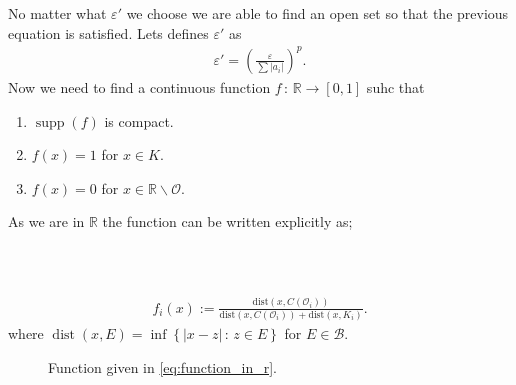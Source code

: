 \documentclass{beamer}
\numberwithin{equation}{section}
\DeclareMathOperator{\supp}{supp}
\DeclareMathOperator{\dist}{dist}
\begin{document}
\begin{frame}\frametitle{{\normalsize \secname} \\ {\large \subsecname}}
    No matter what $\varepsilon'$ we choose we are able to find an open set so that the previous equation is satisfied.
    Lets defines $\varepsilon'$ as
    \begin{align}
        \varepsilon' = \left( \frac{\varepsilon}{\sum |a_i|} \right)^p.
    \end{align}
    Now we need to find a continuous function $f \, : \, \mathbb{R} \to [0,1]$ suhc that
    \begin{enumerate}
        \item $\supp(f)$ is compact.
        \item $f(x) = 1$ for $x \in K$.
        \item $f(x) = 0$ for $x \in \mathbb{R}\backslash \mathcal{O}$.
    \end{enumerate}
    As we are in $\mathbb{R}$ the function can be written explicitly as;
\end{frame}

\begin{frame}\frametitle{{\normalsize \secname} \\ {\large \subsecname}}
    \begin{align}\label{eq:function_in_r}
        f_i(x):=\frac{\text{dist}(x, C(\mathcal{O}_i))}{\text{dist}(x, C(\mathcal{O}_i))+\text{dist}(x, K_i)}.
    \end{align}
    where $\dist(x, E) = \inf \left\{|x - z| \, : \, z \in E\right\}$ for $ E \in \mathcal{B}$.
    \begin{figure}[h]
        \caption{Function given in \eqref{eq:function_in_r}.}
    \end{figure}
\end{frame}
\end{document}
